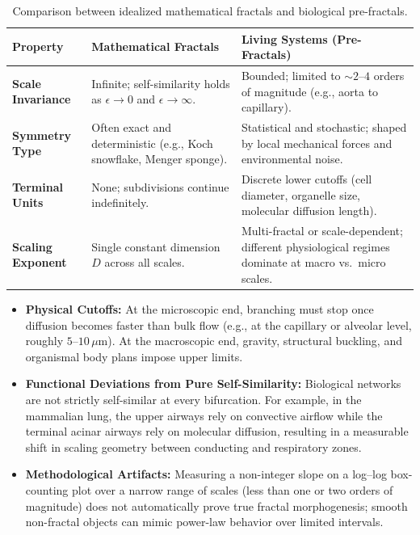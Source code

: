 \documentclass[11pt,a4paper]{article}
\begin{document}
\begin{table}[H]
\centering
\renewcommand{\arraystretch}{1.35}
\begin{tabularx}{\textwidth}{p{3.4cm} p{4.6cm} X}
\toprule
\textbf{Property} & \textbf{Mathematical Fractals} & \textbf{Living Systems (Pre-Fractals)} \\
\midrule
\textbf{Scale Invariance} & Infinite; self-similarity holds as $\epsilon \to 0$ and $\epsilon \to \infty$. & Bounded; limited to $\sim 2\text{--}4$ orders of magnitude (e.g., aorta to capillary). \\
\textbf{Symmetry Type} & Often exact and deterministic (e.g., Koch snowflake, Menger sponge). & Statistical and stochastic; shaped by local mechanical forces and environmental noise. \\
\textbf{Terminal Units} & None; subdivisions continue indefinitely. & Discrete lower cutoffs (cell diameter, organelle size, molecular diffusion length). \\
\textbf{Scaling Exponent} & Single constant dimension $D$ across all scales. & Multi-fractal or scale-dependent; different physiological regimes dominate at macro vs.\ micro scales. \\
\bottomrule
\end{tabularx}
\caption{Comparison between idealized mathematical fractals and biological pre-fractals.}
\label{tab:fractal_comparison}
\end{table}

\begin{itemize}[leftmargin=1.5em]
    \item \textbf{Physical Cutoffs:} At the microscopic end, branching must stop once diffusion becomes faster than bulk flow (e.g., at the capillary or alveolar level, roughly $5\text{--}10\,\mu\text{m}$). At the macroscopic end, gravity, structural buckling, and organismal body plans impose upper limits.
    \item \textbf{Functional Deviations from Pure Self-Similarity:} Biological networks are not strictly self-similar at every bifurcation. For example, in the mammalian lung, the upper airways rely on convective airflow while the terminal acinar airways rely on molecular diffusion, resulting in a measurable shift in scaling geometry between conducting and respiratory zones.
    \item \textbf{Methodological Artifacts:} Measuring a non-integer slope on a log--log box-counting plot over a narrow range of scales (less than one or two orders of magnitude) does not automatically prove true fractal morphogenesis; smooth non-fractal objects can mimic power-law behavior over limited intervals.
\end{itemize}
\end{document}
